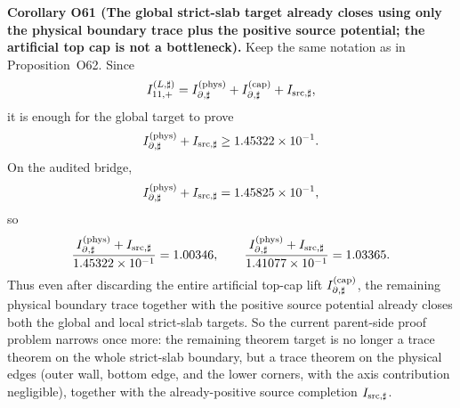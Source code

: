 \documentclass[aps,prd,onecolumn,notitlepage,nofootinbib,superscriptaddress,11pt,floatfix]{revtex4-2}
\begin{document}
\medskip\noindent\textbf{Corollary O61 (The global strict-slab target already closes using only the physical boundary trace plus the positive source potential; the artificial top cap is not a bottleneck).}
Keep the same notation as in Proposition~O62.  Since
\[
I_{11,+}^{(L,\sharp)}
=
I_{\partial,\sharp}^{(\rm phys)}
+
I_{\partial,\sharp}^{(\rm cap)}
+
I_{{\rm src},\sharp},
\]
it is enough for the global target to prove
\[
I_{\partial,\sharp}^{(\rm phys)}+I_{{\rm src},\sharp}\ge 1.45322\times10^{-1}.
\]
On the audited bridge,
\[
I_{\partial,\sharp}^{(\rm phys)}+I_{{\rm src},\sharp}
=
1.45825\times10^{-1},
\]
so
\[
\frac{I_{\partial,\sharp}^{(\rm phys)}+I_{{\rm src},\sharp}}{1.45322\times10^{-1}}
=
1.00346,
\qquad
\frac{I_{\partial,\sharp}^{(\rm phys)}+I_{{\rm src},\sharp}}{1.41077\times10^{-1}}
=
1.03365.
\]
Thus even after discarding the entire artificial top-cap lift \(I_{\partial,\sharp}^{(\rm cap)}\), the remaining physical boundary trace together with the positive source potential already closes both the global and local strict-slab targets.  So the current parent-side proof problem narrows once more: the remaining theorem target is no longer a trace theorem on the whole strict-slab boundary, but a trace theorem on the physical edges (outer wall, bottom edge, and the lower corners, with the axis contribution negligible), together with the already-positive source completion \(I_{{\rm src},\sharp}\).
\end{document}
